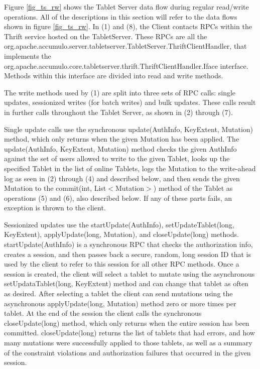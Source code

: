 \documentclass[letterpaper,onecolumn,12pt,titlepage]{article}
\begin{document}
Figure \ref{fig_ts_rw} shows the Tablet Server data flow during regular read/write operations.
All of the descriptions in this section will refer to the data flows shown in figure \ref{fig_ts_rw}.
In (1) and (8), the Client contacts RPCs within the Thrift service hosted on the TabletServer. 
These RPCs are all the org.apache.accumulo.server.tabletserver.TabletServer.ThriftClientHandler, that implements the org.apache.accumulo.core.tabletserver.thrift.ThriftClientHandler.Iface interface.
Methods within this interface are divided into read and write methods.

The write methods used by (1) are split into three sets of RPC calls: single updates, sessionized writes (for batch writes) and bulk updates.
These calls result in further calls throughout the Tablet Server, as shown in (2) through (7).

Single update calls use the synchronous update(AuthInfo, KeyExtent, Mutation) method, which only returns when the given Mutation has been applied.
The update(AuthInfo, KeyExtent, Mutation) method checks the given AuthInfo against the set of users allowed to write to the given Tablet, 
looks up the specified Tablet in the list of online Tablets, logs the Mutation to the write-ahead log as seen in (2) through (4) and described below, 
and then sends the given Mutation to the commit(int, List$<$Mutation$>$) method of the Tablet as operations (5) and (6), also described below.
If any of these parts fails, an exception is thrown to the client.

Sessionized updates use the startUpdate(AuthInfo), setUpdateTablet(long, KeyExtent), applyUpdate(long, Mutation), and closeUpdate(long) methods.
startUpdate(AuthInfo) is a synchronous RPC that checks the authorization info, creates a session, and then passes back a secure, random, long session ID that is used by the client to refer to this session for all other RPC methods.
Once a session is created, the client will select a tablet to mutate using the asynchronous setUpdataTablet(long, KeyExtent) method and can change that tablet as often as desired.
After selecting a tablet the client can send mutations using the asynchronous applyUpdate(long, Mutation) method zero or more times per tablet.
At the end of the session the client calls the synchronous closeUpdate(long) method, which only returns when the entire session has been committed.
closeUpdate(long) returns the list of tablets that had errors, and how many mutations were successfully applied to those tablets, as well as a summary of the constraint violations and authorization failures that occurred in the given session.
\end{document}
